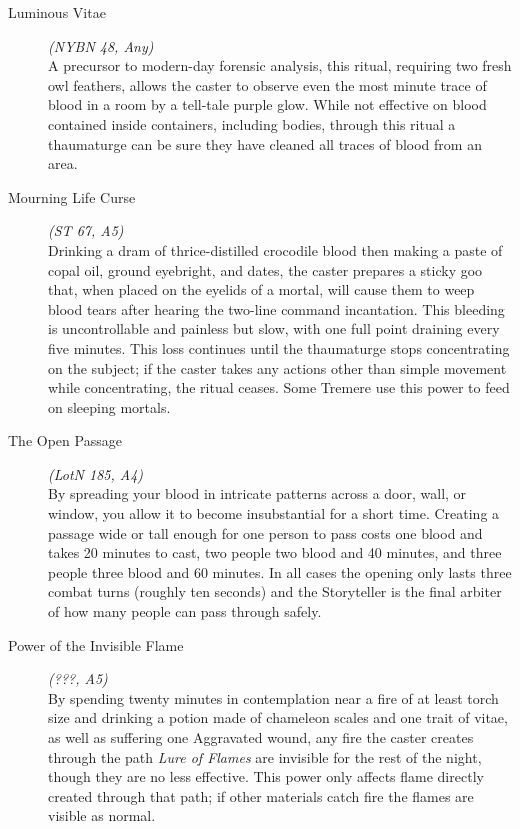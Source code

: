 \begin{description}
	\item[Luminous Vitae] \emph{(NYBN 48, Any)} \hfill \\
	A precursor to modern-day forensic analysis, this ritual, requiring two fresh owl feathers, allows the caster to observe even 
	the most minute trace of blood in a room by a tell-tale purple glow. While not effective on blood contained inside containers, 
	including bodies, through this ritual a thaumaturge can be sure they have cleaned all traces of blood from an area. \\
	
	\item[Mourning Life Curse] \emph{(ST 67, A5)} \hfill \\
	Drinking a dram of thrice-distilled crocodile blood then making a paste of copal oil, ground eyebright, and dates, the caster 
	prepares a sticky goo that, when placed on the eyelids of a mortal, will cause them to weep blood tears after hearing the 
	two-line command incantation.  This bleeding is uncontrollable and painless but slow, with one full point draining every five 
	minutes.  This loss continues until the thaumaturge stops concentrating on the subject; if the caster takes any actions other 
	than simple movement while concentrating, the ritual ceases.  Some Tremere use this power to feed on sleeping mortals. \\
	
	\item[The Open Passage] \emph{(LotN 185, A4)} \hfill \\
	By spreading your blood in intricate patterns across a door, wall, or window, you allow it to become insubstantial for a 
	short time.  Creating a passage wide or tall enough for one person to pass costs one blood and takes 20 minutes to cast, two 
	people two blood and 40 minutes, and three people three blood and 60 minutes.  In all cases the opening only lasts three 
	combat turns (roughly ten seconds) and the Storyteller is the final arbiter of how many people can pass 
	through safely. \\
	
	\item[Power of the Invisible Flame] \emph{(???, A5)} \hfill \\
	By spending twenty minutes in contemplation near a fire of at least torch size and drinking a potion made of chameleon scales 
	and one trait of vitae, as well as suffering one Aggravated wound, any fire the caster creates through the path 
	\emph{Lure of Flames} are invisible for the rest of the night, though they are no less effective.  This power only affects 
	flame directly created through that path; if other materials catch fire the flames are visible as normal. \\
	

\end{description}
